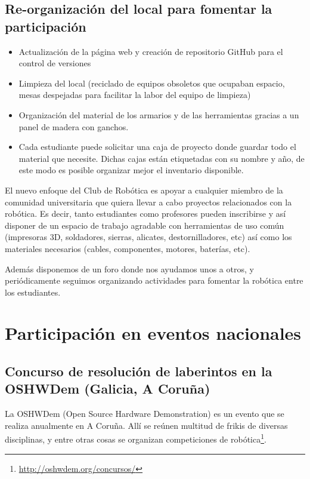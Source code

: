 \documentclass[12pt,twoside]{report}
\begin{document}
\subsection{Re-organización del local para fomentar la participación}

\begin{itemize}
\item Actualización de la página web y creación de repositorio GitHub para el control de versiones
\item Limpieza del local (reciclado de equipos obsoletos que ocupaban espacio, mesas despejadas para facilitar la labor del equipo de limpieza)
\item Organización del material de los armarios y de las herramientas gracias a un panel de madera con ganchos.
\item Cada estudiante puede solicitar una caja de proyecto donde guardar todo el material que necesite. Dichas cajas están etiquetadas con su nombre y año, de este modo es posible organizar mejor el inventario disponible.
\end{itemize}

El nuevo enfoque del Club de Robótica es apoyar a cualquier miembro de la comunidad universitaria que quiera llevar a cabo proyectos relacionados con la robótica. Es decir, tanto estudiantes como profesores pueden inscribirse y así disponer de un espacio de trabajo agradable con herramientas de uso común (impresoras 3D, soldadores, sierras, alicates, destornilladores, etc) así como los materiales necesarios (cables, componentes, motores, baterías, etc).

Además disponemos de un foro donde nos ayudamos unos a otros, y periódicamente seguimos organizando actividades para fomentar la robótica entre los estudiantes.


\newpage


\section{Participación en eventos nacionales}


\subsection{Concurso de resolución de laberintos en la OSHWDem (Galicia, A Coruña)}

La OSHWDem (Open Source Hardware Demonstration) es un evento que se realiza anualmente en A Coruña. Allí se reúnen multitud de frikis de diversas disciplinas, y entre otras cosas se organizan competiciones de robótica\footnote{\url{http://oshwdem.org/concursos/}}.
\end{document}
